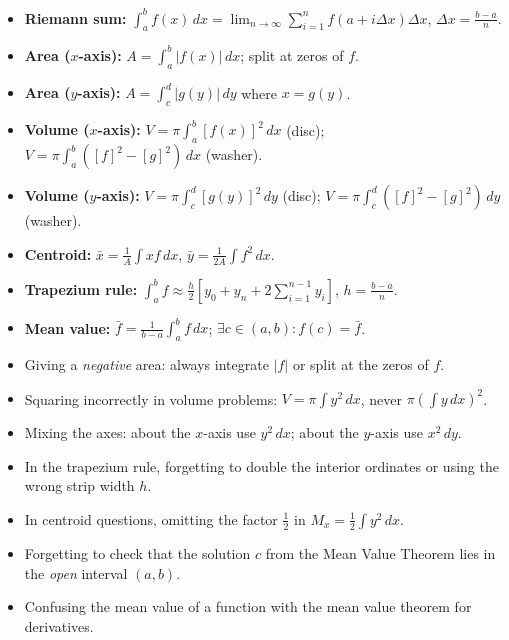 \documentclass[11pt]{article}
\begin{document}
\begin{aretenir}
\begin{itemize}
\item \textbf{Riemann sum:} $\int_a^b f(x)\,dx = \lim_{n\to\infty} \sum_{i=1}^n f(a+i\Delta x)\Delta x$, $\Delta x = \frac{b-a}{n}$.
\item \textbf{Area ($x$-axis):} $A = \int_a^b |f(x)|\,dx$; split at zeros of $f$.
\item \textbf{Area ($y$-axis):} $A = \int_c^d |g(y)|\,dy$ where $x=g(y)$.
\item \textbf{Volume ($x$-axis):} $V = \pi\int_a^b [f(x)]^2\,dx$ (disc); $V = \pi\int_a^b ([f]^2-[g]^2)\,dx$ (washer).
\item \textbf{Volume ($y$-axis):} $V = \pi\int_c^d [g(y)]^2\,dy$ (disc); $V = \pi\int_c^d ([f]^2-[g]^2)\,dy$ (washer).
\item \textbf{Centroid:} $\bar{x} = \frac{1}{A}\int x f\,dx$, $\bar{y} = \frac{1}{2A}\int f^2\,dx$.
\item \textbf{Trapezium rule:} $\int_a^b f \approx \frac{h}{2}[y_0+y_n+2\sum_{i=1}^{n-1}y_i]$, $h=\frac{b-a}{n}$.
\item \textbf{Mean value:} $\bar{f} = \frac{1}{b-a}\int_a^b f\,dx$; $\exists c\in(a,b): f(c)=\bar{f}$.
\end{itemize}
\end{aretenir}

\begin{attention}
\begin{itemize}
\item Giving a \emph{negative} area: always integrate $|f|$ or split at the zeros of $f$.
\item Squaring incorrectly in volume problems: $V = \pi\int y^2\,dx$, never $\pi\left(\int y\,dx\right)^2$.
\item Mixing the axes: about the $x$-axis use $y^2\,dx$; about the $y$-axis use $x^2\,dy$.
\item In the trapezium rule, forgetting to double the interior ordinates or using the wrong strip width $h$.
\item In centroid questions, omitting the factor $\tfrac12$ in $M_x = \tfrac12\int y^2\,dx$.
\item Forgetting to check that the solution $c$ from the Mean Value Theorem lies in the \emph{open} interval $(a,b)$.
\item Confusing the mean value of a function with the mean value theorem for derivatives.
\end{itemize}
\end{attention}
\end{document}
